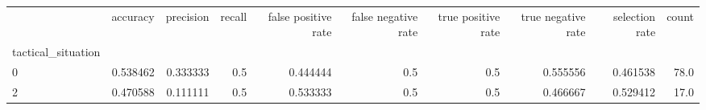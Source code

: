 \begin{tabular}{lrrrrrrrrr}
\toprule
{} &  accuracy &  precision &  recall &  false positive rate &  false negative rate &  true positive rate &  true negative rate &  selection rate &  count \\
tactical\_situation &           &            &         &                      &                      &                     &                     &                 &        \\
\midrule
0                  &  0.538462 &   0.333333 &     0.5 &             0.444444 &                  0.5 &                 0.5 &            0.555556 &        0.461538 &   78.0 \\
2                  &  0.470588 &   0.111111 &     0.5 &             0.533333 &                  0.5 &                 0.5 &            0.466667 &        0.529412 &   17.0 \\
\bottomrule
\end{tabular}
